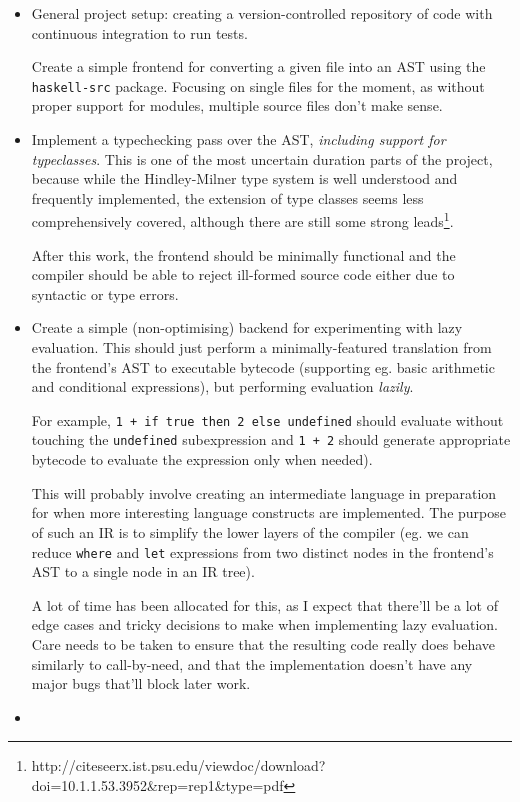 \documentclass[12pt]{article}
\newcommand\haskell[1]{\texttt{#1}}
\newcommand\monospace[1]{\texttt{#1}}
\begin{document}
\begin{itemize}
\item
{

    General project setup: creating a version-controlled repository of code with continuous integration to run tests.

    Create a simple frontend for converting a given file into an AST using the \monospace{haskell-src} package. Focusing
    on single files for the moment, as without proper support for modules, multiple source files don't make sense.
}
\item
{

    Implement a typechecking pass over the AST, \textit{including support for typeclasses}. This is one of the most
    uncertain duration parts of the project, because while the Hindley-Milner type system is well understood and
    frequently implemented, the extension of type classes seems less comprehensively covered, although there are still
    some strong leads\footnote{http://citeseerx.ist.psu.edu/viewdoc/download?doi=10.1.1.53.3952\&rep=rep1\&type=pdf}.

    After this work, the frontend should be minimally functional and the compiler should be able to reject ill-formed
    source code either due to syntactic or type errors.
}
\item
{

    Create a simple (non-optimising) backend for experimenting with lazy evaluation. This should just perform a
    minimally-featured translation from the frontend's AST to executable bytecode (supporting eg. basic arithmetic and
    conditional expressions), but performing evaluation \textit{lazily}.

    For example, \haskell{1 + if true then 2 else undefined} should evaluate without touching the \haskell{undefined}
    subexpression and \haskell{1 + 2} should generate appropriate bytecode to evaluate the expression only when needed).
    
    This will probably involve creating an intermediate language in preparation for when more interesting language
    constructs are implemented. The purpose of such an IR is to simplify the lower layers of the compiler (eg. we can
    reduce \haskell{where} and \haskell{let} expressions from two distinct nodes in the frontend's AST to a single node
    in an IR tree).

    A lot of time has been allocated for this, as I expect that there'll be a lot of edge cases and tricky decisions to
    make when implementing lazy evaluation. Care needs to be taken to ensure that the resulting code really does behave
    similarly to call-by-need, and that the implementation doesn't have any major bugs that'll block later work.
}
\item
{

}
\end{itemize}
\end{document}
